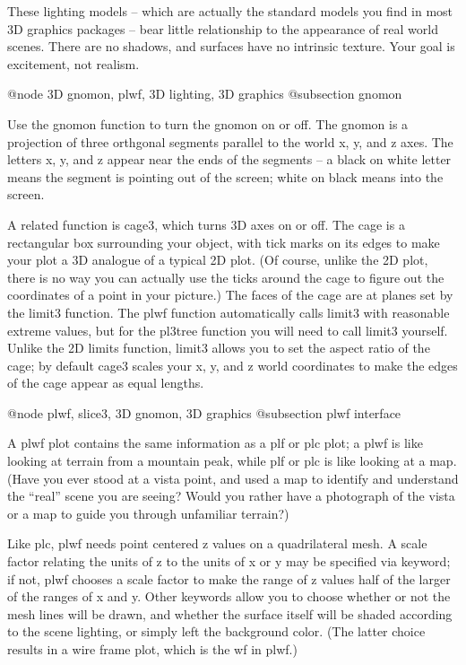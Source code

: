 These lighting models -- which are actually the standard models you
find in most 3D graphics packages -- bear little relationship to the
appearance of real world scenes.  There are no shadows, and surfaces
have no intrinsic texture.  Your goal is excitement, not realism.

@node 3D gnomon, plwf, 3D lighting, 3D graphics
@subsection gnomon

Use the gnomon function to turn the gnomon on or off.  The gnomon is a
projection of three orthgonal segments parallel to the world x, y, and
z axes.  The letters x, y, and z appear near the ends of the segments
-- a black on white letter means the segment is pointing out of the
screen; white on black means into the screen.

A related function is cage3, which turns 3D axes on or off.  The cage is
a rectangular box surrounding your object, with tick marks on its edges
to make your plot a 3D analogue of a typical 2D plot.  (Of course,
unlike the 2D plot, there is no way you can actually use the ticks
around the cage to figure out the coordinates of a point in your
picture.)  The faces of the cage are at planes set by the limit3
function.  The plwf function automatically calls limit3 with reasonable
extreme values, but for the pl3tree function you will need to call
limit3 yourself.  Unlike the 2D limits function, limit3 allows you to
set the aspect ratio of the cage; by default cage3 scales your x, y, and
z world coordinates to make the edges of the cage appear as equal
lengths.

@node plwf, slice3, 3D gnomon, 3D graphics
@subsection plwf interface

A plwf plot contains the same information as a plf or plc plot; a plwf
is like looking at terrain from a mountain peak, while plf or plc is
like looking at a map.  (Have you ever stood at a vista point, and
used a map to identify and understand the ``real'' scene you are
seeing?  Would you rather have a photograph of the vista or a map to
guide you through unfamiliar terrain?)

Like plc, plwf needs point centered z values on a quadrilateral mesh.
A scale factor relating the units of z to the units of x or y may be
specified via keyword; if not, plwf chooses a scale factor to make the
range of z values half of the larger of the ranges of x and y.  Other
keywords allow you to choose whether or not the mesh lines will be
drawn, and whether the surface itself will be shaded according to the
scene lighting, or simply left the background color.  (The latter
choice results in a wire frame plot, which is the wf in plwf.)

